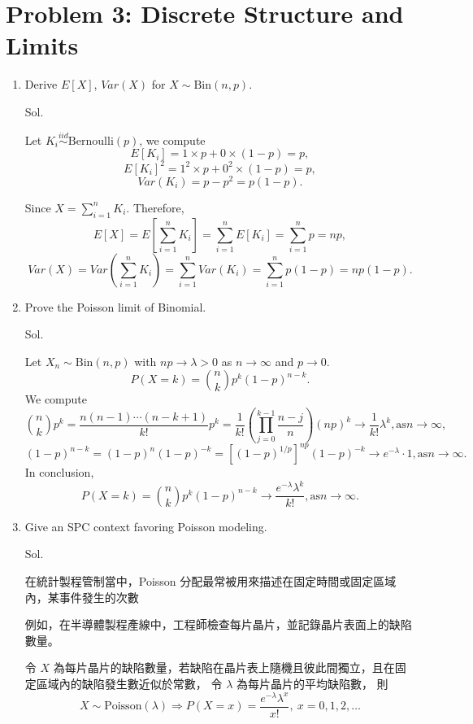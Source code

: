 \documentclass[a4paper, 12pt]{article}  %
\begin{document}
\section*{Problem 3: Discrete Structure and Limits}
    \begin{enumerate}
        \item Derive $E[X]$, $Var(X)$ for $X \sim \mathrm{Bin}(n,p)$.
        
        Sol.

        Let $K_i\stackrel{iid}{\sim}\mathrm{Bernoulli}(p)$, we compute
        $$E[K_i]=1\times p+0\times (1-p)=p,$$
        $$E[K_i]^2=1^2\times p+0^2\times (1-p)=p,$$
        $$Var(K_i)=p-p^2=p(1-p).$$
        
        Since $X=\sum_{i=1}^n K_i$. Therefore,
        $$E[X]=E\!\left[\sum_{i=1}^n K_i\right]=\sum_{i=1}^n E[K_i]=\sum_{i=1}^n p=np,$$
        $$Var(X)=Var\left(\sum_{i=1}^n K_i\right)=\sum_{i=1}^n Var(K_i)=\sum_{i=1}^n p(1-p)=np(1-p).$$
        
        \item Prove the Poisson limit of Binomial.
        
        Sol.

        Let $X_n\sim \mathrm{Bin}(n,p)$ with $np\to \lambda >0$ as $n\to\infty$ and $p\to 0$.
        $$P(X=k)=\binom{n}{k}p^k(1-p)^{n-k}.$$
        We compute
        $$\binom{n}{k}p^k=\frac{n(n-1)\cdots(n-k+1)}{k!}p^k=\frac{1}{k!}\left(\prod_{j=0}^{k-1}\frac{n-j}{n}\right)(np)^k\to\frac{1}{k!}\lambda^k,　\text{as}　　n\to\infty,$$
        $$(1-p)^{n-k}=(1-p)^n(1-p)^{-k}=\left[\left(1-p\right)^{1/p}\right]^{np}(1-p)^{-k}\to e^{-\lambda}\cdot 1,　\text{as}　　n\to\infty.$$
        In conclusion, $$P(X=k)=\binom{n}{k}p^k(1-p)^{n-k}\to \frac{e^{-\lambda}\lambda^k}{k!},　\text{as}　　n\to\infty.$$

        \item Give an SPC context favoring Poisson modeling.
        
        Sol.
        
        在統計製程管制當中，Poisson 分配最常被用來描述在固定時間或固定區域內，某事件發生的次數

        例如，在半導體製程產線中，工程師檢查每片晶片，並記錄晶片表面上的缺陷數量。

        令 $X$ 為每片晶片的缺陷數量，若缺陷在晶片表上隨機且彼此間獨立，且在固定區域內的缺陷發生數近似於常數，
        令 $\lambda$ 為每片晶片的平均缺陷數，
        則 $$X \sim \mathrm{Poisson}(\lambda)\Rightarrow P(X=x)=\frac{e^{-\lambda}\lambda^x}{x!},\ x=0,1,2,\dots$$
        
    \end{enumerate}
\end{document}
